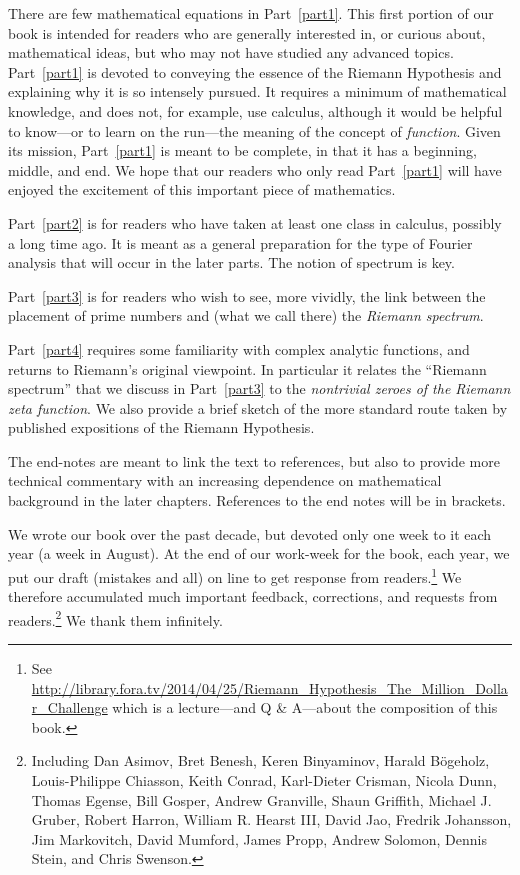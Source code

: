 \documentclass[openany]{book}
\theoremstyle{plain}
\theoremstyle{definition}
\begin{document}
  There are  few
mathematical equations in Part~\ref{part1}.  This first portion of our book is intended for readers who are generally interested in, or curious about, mathematical ideas, but who may not have studied any advanced topics. Part~\ref{part1} is devoted to conveying the essence of the Riemann Hypothesis and explaining why it is so intensely pursued. It requires a minimum of mathematical knowledge, and does not,  for example, use calculus, although it would be helpful to know---or to learn on the run---the meaning of  the concept of {\it function}. Given its mission, Part~\ref{part1}  is meant to be complete, in that it has a beginning, middle, and end.  We hope that our readers who only read Part~\ref{part1} will have enjoyed the excitement  of this important piece of mathematics.



    Part~\ref{part2} is for readers who have taken at least one class in calculus, possibly a long time ago.  It is meant as a general preparation for the type of Fourier analysis that will occur in the later parts. The notion of spectrum is key.

    Part~\ref{part3} is for readers who wish to see, more vividly, the link between the placement of prime numbers and (what we call there) the {\it Riemann spectrum}.

    Part~\ref{part4} requires some familiarity with complex analytic functions, and returns to Riemann's original viewpoint.  In particular it  relates the ``Riemann spectrum'' that we discuss in Part~\ref{part3} to the {\it nontrivial zeroes of the Riemann zeta function}. We also provide a brief sketch of the more standard route taken by published expositions of the Riemann Hypothesis.

      The end-notes are meant to link the text to references, but also to provide  more technical commentary with an increasing dependence on mathematical background in the later chapters.  References to the end notes will be in brackets.

      We wrote our book over the past decade, but devoted only one week to it each year (a week in August).    At the end of our work-week for the book, each year, we put our draft (mistakes and all) on line to get response from readers.{\footnote{See  {\url{http://library.fora.tv/2014/04/25/Riemann_Hypothesis_The_Million_Dollar_Challenge}} which is a lecture---and Q \& A---about the composition of this book.}} We therefore accumulated much important feedback, corrections, and requests from readers.\footnote{Including
Dan Asimov, Bret Benesh, Keren Binyaminov, Harald B\"{o}geholz, Louis-Philippe Chiasson, Keith Conrad, Karl-Dieter Crisman, Nicola Dunn, Thomas Egense, Bill Gosper,  Andrew Granville, Shaun Griffith, Michael J. Gruber, Robert Harron,  William R. Hearst III, David Jao, Fredrik Johansson, Jim Markovitch, David Mumford, James Propp, Andrew Solomon, Dennis Stein, and Chris Swenson.}
We thank them infinitely.
\end{document}
